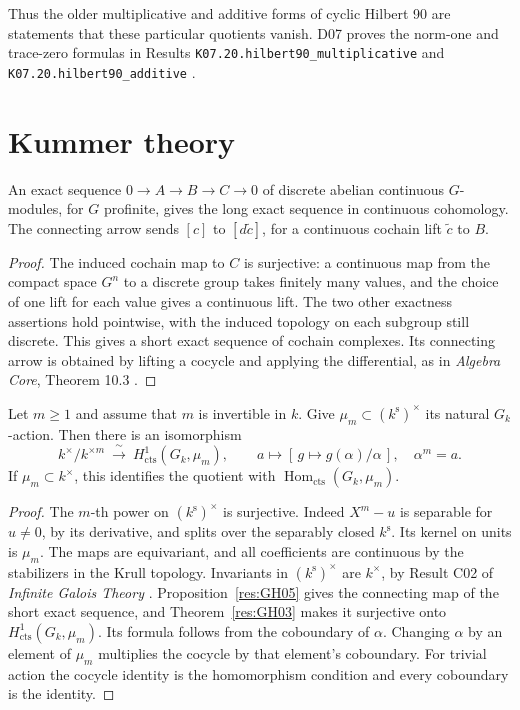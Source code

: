 Thus the older multiplicative and additive forms of cyclic
Hilbert 90 are statements that these particular quotients vanish.
D07 proves the norm-one and trace-zero formulas in Results
\texttt{K07.20.hilbert90\_multiplicative} and
\texttt{K07.20.hilbert90\_additive} \cite[PDF pp.~171--172]{mg-d07}.

\section{Kummer theory}

\begin{proposition}
\label{res:GH05}
An exact sequence \(0\to A\to B\to C\to0\) of discrete abelian
continuous \(G\)-modules, for \(G\) profinite, gives the long exact
sequence in continuous cohomology. The connecting arrow sends
\([c]\) to \([d\widetilde c]\), for a continuous cochain lift
\(\widetilde c\) to \(B\).
\end{proposition}
\begin{proof}
The induced cochain map to \(C\) is surjective: a continuous map from
the compact space \(G^n\) to a discrete group takes finitely many
values, and the choice of one lift for each value gives a continuous
lift. The two other exactness assertions hold pointwise, with the
induced topology on each subgroup still discrete. This gives a
short exact sequence of cochain complexes. Its connecting arrow
is obtained by lifting a cocycle and applying the differential,
as in \emph{Algebra Core}, Theorem 10.3
\cite[PDF p.~51]{mg-algebra-core}.
\end{proof}

\begin{theorem}
\label{res:GH06}
Let \(m\geq 1\) and assume that \(m\) is invertible in \(k\). Give
\(\mu_m\subset(k^{\mathrm s})^\times\) its natural \(G_k\)-action.
Then there is an isomorphism
\[
 k^\times/k^{\times m}
   \ \xrightarrow{\ \sim\ }\ H^1_{\mathrm{cts}}(G_k,\mu_m),
 \qquad
 a\longmapsto [\,g\mapsto g(\alpha)/\alpha\,],\quad \alpha^m=a.
\]
If \(\mu_m\subset k^\times\), this identifies the quotient with
\(\operatorname{Hom}_{\mathrm{cts}}(G_k,\mu_m)\).
\end{theorem}
\begin{proof}
The \(m\)-th power on \((k^{\mathrm s})^\times\) is surjective.
Indeed \(X^m-u\) is separable for \(u\ne0\), by its derivative, and
splits over the separably closed \(k^{\mathrm s}\). Its kernel on
units is \(\mu_m\). The maps are equivariant, and all coefficients
are continuous by the stabilizers in the Krull topology.
Invariants in \((k^{\mathrm s})^\times\) are \(k^\times\), by
Result C02 of \emph{Infinite Galois Theory}
\cite[PDF p.~12]{mg-aft}. Proposition~\ref{res:GH05} gives the connecting
map of the short exact sequence, and Theorem~\ref{res:GH03} makes it
surjective onto \(H^1_{\mathrm{cts}}(G_k,\mu_m)\). Its formula follows
from the coboundary of \(\alpha\). Changing \(\alpha\) by an element of
\(\mu_m\) multiplies the cocycle by that element's coboundary. For
trivial action the cocycle identity is the homomorphism condition and
every coboundary is the identity.
\end{proof}

